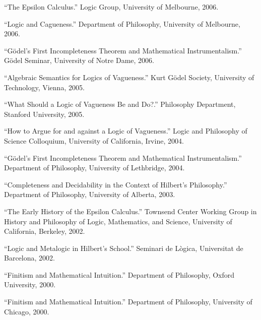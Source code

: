 \documentclass[11pt]{article}
\def\printdate#1{\xprintdate#1-}
\def\xprintdate#1-#2-#3-{#1}
\begin{document}
\ind ``The Epsilon Calculus.'' Logic Group, University of Melbourne, \printdate{2006-05-26}.


\ind ``Logic and Cagueness.'' Department of Philosophy, University of Melbourne, \printdate{2006-05-25}.


\ind ``Gödel's First Incompleteness Theorem and Mathematical Instrumentalism.'' Gödel Seminar, University of Notre Dame, \printdate{2006-05-30}.







\ind ``Algebraic Semantics for Logics of Vagueness.'' Kurt Gödel Society, University of Technology, Vienna, \printdate{2005-08-10}.


\ind ``What Should a Logic of Vagueness Be and Do?.'' Philosophy Department, Stanford University, \printdate{2005-01-28}.


\ind ``How to Argue for and against a Logic of Vagueness.'' Logic and Philosophy of Science Colloquium, University of California, Irvine, \printdate{2004-12-10}.







\ind ``Gödel's First Incompleteness Theorem and Mathematical Instrumentalism.'' Department of Philosophy, University of Lethbridge, \printdate{2004-11-23}.





\ind ``Completeness and Decidability in the Context of Hilbert's Philosophy.'' Department of Philosophy, University of Alberta, \printdate{2003-01-28}.


\ind ``The Early History of the Epsilon Calculus.'' Townsend Center Working Group in History and Philosophy of Logic,
Mathematics, and Science, University of California, Berkeley, \printdate{2002-09-04}.


\ind ``Logic and Metalogic in Hilbert's School.'' Seminari de Lògica, Universitat de Barcelona, \printdate{2002-05-28}.
















\ind ``Finitism and Mathematical Intuition.'' Department of Philosophy, Oxford University, \printdate{2000-05-018}.


\ind ``Finitism and Mathematical Intuition.'' Department of Philosophy, University of Chicago, \printdate{2000-02-08}.
\end{document}
